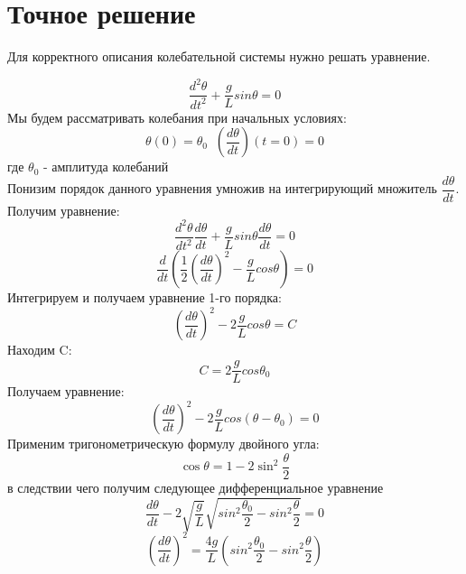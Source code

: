 \documentclass[a4paper,12pt]{article}
\begin{document}
\section{Точное решение}

Для корректного описания колебательной системы нужно решать уравнение.


\begin{equation}
\frac{d^2\theta}{dt^2} + \frac{g}{L}sin\theta = 0
\end{equation}
Мы будем рассматривать колебания при начальных условиях:
\begin{equation}\label{nachal'noe}
    \theta(0) = \theta_0\;\; \left(\frac{d\theta}{dt}\right)(t = 0) = 0
\end{equation}
где $\theta_0$ - амплитуда колебаний
\\Понизим порядок данного уравнения умножив на интегрирующий множитель $\dfrac{d\theta}{dt}$. Получим уравнение:
\begin{equation}
    \frac{d^2\theta}{dt^2}\frac{d\theta}{dt} + \frac{g}{L}sin\theta\frac{d\theta}{dt} = 0
\end{equation}
\begin{equation}
    \frac{d}{dt}\left(\frac{1}{2}\left(\frac{d\theta}{dt}\right)^2 - \frac{g}{L}cos\theta\right) = 0
\end{equation}
Интегрируем и получаем уравнение 1-го порядка:
\begin{equation}
    \left(\frac{d\theta}{dt}\right)^2 - 2\frac{g}{L}cos\theta = C
\end{equation}
Находим C:
\begin{equation}
C = 2\frac{g}{L}cos\theta_0
\end{equation}
Получаем уравнение:
\begin{equation}
    \left(\frac{d\theta}{dt}\right)^2 - 2\frac{g}{L}cos\left(\theta - \theta_0\right) = 0
\end{equation}
Применим тригонометрическую формулу двойного угла:
\begin{equation}
    \cos{\theta} = 1 - 2\sin^2{\dfrac{\theta}{2}}
\end{equation}
в следствии чего получим следующее дифференциальное уравнение
\begin{equation}
    \frac{d\theta}{dt} - 2\sqrt{\frac{g}{L}}\sqrt{sin^2\frac{\theta_0}{2} - sin^2\frac{\theta}{2}} = 0
\end{equation}
\begin{equation}\label{dtheta:dt}
    \left(\frac{d\theta}{dt}\right)^2 = 
    \frac{4g}{L}\left(sin^2\frac{\theta_0}{2} - sin^2\frac{\theta}{2}\right)
\end{equation}
\end{document}

